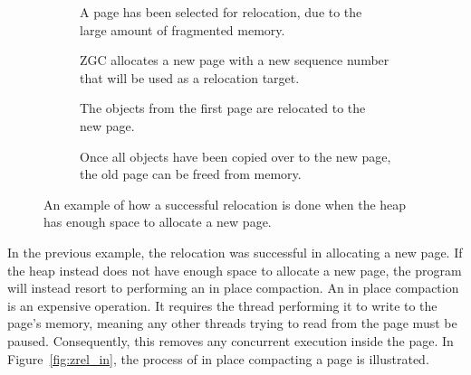 \begin{figure}[H]
    \centering
    \begin{subfigure}[t]{.2\textwidth}
        \centering
        
        \caption{A page has been selected for relocation, due to the large amount of fragmented memory.}
        \label{fig:zrel_new1}
    \end{subfigure}%
    \hfill\vline\hfill
    \begin{subfigure}[t]{.2\textwidth}
        \centering
        
        \caption{ZGC allocates a new page with a new sequence number that will be used as a relocation target.}
        \label{fig:zrel_new2}
    \end{subfigure}%
    \hfill\vline\hfill
    \begin{subfigure}[t]{.2\textwidth}
        \centering
        
        \caption{The objects from the first page are relocated to the new page.}
        \label{fig:zrel_new3}
    \end{subfigure}%
    \hfill\vline\hfill
    \begin{subfigure}[t]{.2\textwidth}
        \centering
        
        \caption{Once all objects have been copied over to the new page, the old page can be freed from memory.}
        \label{fig:zrel_new3}
    \end{subfigure}%
    \caption{An example of how a successful relocation is done when the heap has enough space to allocate a new page.}
    \label{fig:zrel_new}
\end{figure}

In the previous example, the relocation was successful in allocating a new page. If the heap instead does not have enough space to allocate a new page, the program will instead resort to performing an in place compaction. An in place compaction is an expensive operation. It requires the thread performing it to write to the page's memory, meaning any other threads trying to read from the page must be paused. Consequently, this removes any concurrent execution inside the page. In Figure~\ref{fig:zrel_in}, the process of in place compacting a page is illustrated. 

